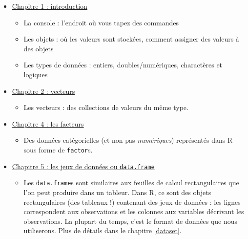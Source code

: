 \documentclass[a4paperpaper,]{article}
\providecommand{\tightlist}{%
  \setlength{\itemsep}{0pt}\setlength{\parskip}{0pt}}
\theoremstyle{definition}
\theoremstyle{definition}
\theoremstyle{definition}
\theoremstyle{remark}
\begin{document}
\begin{itemize}
\tightlist
\item
  \href{https://campus.datacamp.com/courses/introduction-a-r/chapitre-1-introduction?ex=1}{Chapitre
  1 : introduction}

  \begin{itemize}
  \tightlist
  \item
    La console : l'endroit où vous tapez des commandes
  \item
    Les objets : où les valeurs sont stockées, comment assigner des
    valeurs à des objets
  \item
    Les types de données : entiers, doubles/numériques, charactères et
    logiques
  \end{itemize}
\item
  \href{https://campus.datacamp.com/courses/introduction-a-r/chapitre-2-les-vecteurs?ex=1}{Chapitre
  2 : vecteurs}

  \begin{itemize}
  \tightlist
  \item
    Les vecteurs : des collections de valeurs du même type.
  \end{itemize}
\item
  \href{https://campus.datacamp.com/courses/introduction-a-r/chapitre-4-facteurs?ex=1}{Chapitre
  4 : les facteurs}

  \begin{itemize}
  \tightlist
  \item
    Des données catégorielles (et non pas \emph{numériques}) représentés
    dans R sous forme de \texttt{factor}s.
  \end{itemize}
\item
  \href{https://campus.datacamp.com/courses/introduction-a-r/chapitre-5-les-jeux-de-donnees?ex=1}{Chapitre
  5 : les jeux de données ou \texttt{data.frame}}

  \begin{itemize}
  \tightlist
  \item
    Les \texttt{data.frame}s sont similaires aux feuilles de calcul
    rectangulaires que l'on peut produire dans un tableur. Dans R, ce
    sont des objets rectangulaires (des tableaux !) contenant des jeux
    de données : les lignes correspondent aux observations et les
    colonnes aux variables décrivant les observations. La plupart du
    temps, c'est le format de données que nous utiliserons. Plus de
    détails dans le chapitre \ref{dataset}.
  \end{itemize}
\end{itemize}
\end{document}
